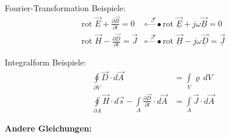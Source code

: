 Fourier-Transformation Beispiele:
\begin{align}
\text{rot } \vec{E} + \frac{\partial \vec{B}}{\partial t} = 0 &\overset{\mathcal{F}}{\circ\text{---}\bullet} \text{rot } \underline{\vec{E}} + j\omega \underline{\vec{B}} = 0 \\
\text{rot } \vec{H} - \frac{\partial \vec{D}}{\partial t} = \vec{J} &\overset{\mathcal{F}}{\circ\text{---}\bullet} \text{rot } \underline{\vec{H}} - j\omega \underline{\vec{D}} = \underline{\vec{J}}
\end{align}

Integralform Beispiele:
\begin{align}
\oint\limits_{\partial V} \vec{D} \cdot d\vec{A} &= \int\limits_V \varrho \, dV \\
\oint\limits_{\partial A} \vec{H} \cdot d\vec{s} - \int\limits_A \frac{\partial \vec{D}}{\partial t} \cdot d\vec{A} &= \int\limits_A \vec{J} \cdot d\vec{A}
\end{align}


\textbf{Andere Gleichungen:}


